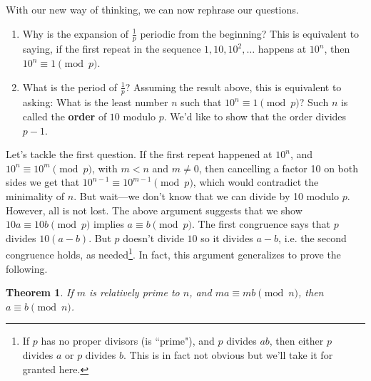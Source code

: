 \documentclass[12pt,twoside]{article}
\theoremstyle{norm}
\newtheorem{thm}{Theorem}[section]
\newcommand{\rc}[1]{\frac{1}{#1}}
\begin{document}
With our new way of thinking, we can now rephrase our questions.
\begin{enumerate}
\item
Why is the expansion of $\rc p$ periodic from the beginning? %
This is equivalent to saying, if the first repeat in the sequence $1, 10, 10^2,\ldots $ happens at $10^n$, then $10^n\equiv 1\pmod{p}$.
\item 
What is the period of $\rc p$? Assuming the result above, this is equivalent to asking: What is the least number $n$ such that $10^{n}\equiv 1\pmod{p}$? Such $n$ is called the \textbf{order} of $10$ modulo $p$. We'd like to show that the order divides $p-1$.
\end{enumerate}
Let's tackle the first question.
If the first repeat happened at $10^n$, and $10^n\equiv 10^m\pmod{p}$, with $m<n$ and $m\neq 0$, then cancelling a factor 10 on both sides we get that $10^{n-1}\equiv 10^{m-1}\pmod{p}$, which would contradict the minimality of $n$. But wait---we don't know that we can divide by 10 modulo $p$. 
However, all is not lost. The above argument suggests that we show $10a\equiv 10b\pmod{p}$ implies $a\equiv b\pmod{p}$. The first congruence says that $p$ divides $10(a-b)$. But $p$ doesn't divide $10$ so it divides $a-b$, i.e. the second congruence holds, as needed\footnote{If $p$ has no proper divisors (is ``prime"), and $p$ divides $ab$, then either $p$ divides $a$ or $p$ divides $b$. This is in fact not obvious but we'll take it for granted here.}. In fact, this argument generalizes to prove the following.
\begin{thm}\label{canc}
If $m$ is relatively prime to $n$, and $ma\equiv mb\pmod{n}$, then $a\equiv b\pmod{n}$.
\end{thm}
\end{document}

